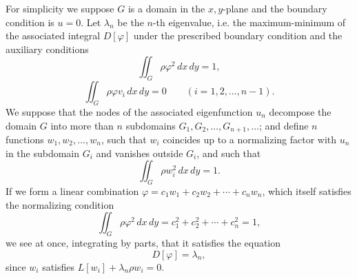 For simplicity we suppose $G$ is a domain in the $x,y$-plane and the boundary condition is $u=0$. Let $\lambda_n$ be the $n$-th eigenvalue, i.e. the maximum-minimum of the associated integral $D[\varphi]$ under the prescribed boundary condition and the auxiliary conditions
\begin{equation}\tag{48}
\iint_G\rho\varphi^2\,dx\,dy=1,
\end{equation}
\begin{equation}\tag{49}
\iint_G\rho\varphi v_i\,dx\,dy=0\qquad(i=1,2,\ldots,n-1).
\end{equation}
We suppose that the nodes of the associated eigenfunction $u_n$ decompose the domain $G$ into more than $n$ subdomains $G_1,G_2,\ldots,G_{n+1},\ldots$; and define $n$ functions $w_1,w_2,\ldots,w_n$, such that $w_i$ coincides up to a normalizing factor with $u_n$ in the subdomain $G_i$ and vanishes outside $G_i$, and such that
\[
\iint_G\rho w_i^2\,dx\,dy=1.
\]
If we form a linear combination $\varphi=c_1w_1+c_2w_2+\cdots+c_nw_n$, which itself satisfies the normalizing condition
\[
\iint_G\rho\varphi^2\,dx\,dy=c_1^2+c_2^2+\cdots+c_n^2=1,
\]
we see at once, integrating by parts, that it satisfies the equation
\[
D[\varphi]=\lambda_n,
\]
since $w_i$ satisfies $L[w_i]+\lambda_n\rho w_i=0$.

